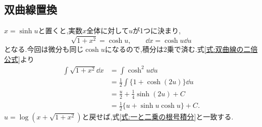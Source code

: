 \subsection{双曲線置換}

$x=\sinh u$と置くと,実数$x$全体に対して$u$が1つに決まり,
\[
\sqrt{1+x^2}=\cosh u,\qquad
\dd x=\cosh u\dd u
\]
となる.今回は微分も同じ$\cosh u$になるので,積分は2乗で済む.式\eqref{式:双曲線の二倍公式}より
\[
\begin{aligned}
\int\sqrt{1+x^2}\dd x
&=\int\cosh^2u\dd u\\
&=\frac12\int\{1+\cosh(2u)\}\dd u\\
&=\frac u2+\frac14\sinh(2u)+C\\
&=\frac12\{u+\sinh u\cosh u\}+C.
\end{aligned}
\]
$u=\log(x+\sqrt{1+x^2})$と戻せば,式\eqref{式:一と二乗の根号積分}と一致する.


